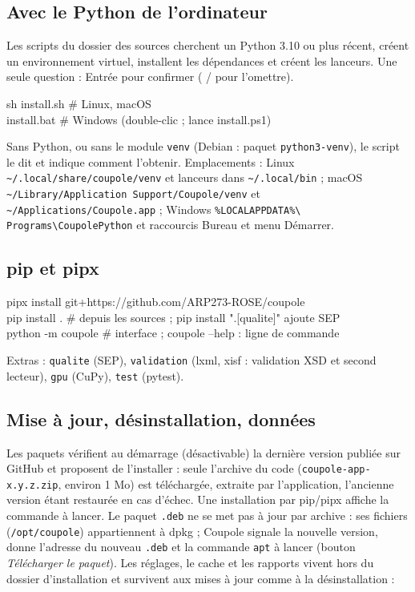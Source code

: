 \subsection{Avec le Python de l'ordinateur}
Les scripts du dossier des sources cherchent un Python 3.10 ou plus récent, créent un environnement virtuel,
installent les dépendances et créent les lanceurs. Une seule question : Entrée pour confirmer ( /
 pour l'omettre).
\begin{ccode}
sh install.sh                \# Linux, macOS\\
install.bat                  \# Windows (double-clic ; lance install.ps1)
\end{ccode}
Sans Python, ou sans le module \texttt{venv} (Debian : paquet \texttt{python3-venv}), le script le dit et indique
comment l'obtenir. Emplacements : Linux \texttt{\textasciitilde/.local/share/coupole/venv} et lanceurs dans
\texttt{\textasciitilde/.local/bin} ; macOS \texttt{\textasciitilde/Library/Application Support/Coupole/venv} et
\texttt{\textasciitilde/Applications/Coupole.app} ; Windows \texttt{\%LOCALAPPDATA\%\textbackslash
Programs\textbackslash CoupolePython} et raccourcis Bureau et menu Démarrer.

\subsection{pip et pipx}
\begin{ccode}
pipx install git+https://github.com/ARP273-ROSE/coupole\\
pip install .                 \# depuis les sources ; pip install ".[qualite]" ajoute SEP\\
python -m coupole             \# interface ; coupole --help : ligne de commande
\end{ccode}
Extras : \texttt{qualite} (SEP), \texttt{validation} (lxml, xisf : validation XSD et second lecteur),
\texttt{gpu} (CuPy), \texttt{test} (pytest).

\subsection{Mise à jour, désinstallation, données}\label{sec:donnees}
Les paquets vérifient au démarrage (désactivable) la dernière version publiée sur GitHub et proposent de
l'installer : seule l'archive du code (\texttt{coupole-app-x.y.z.zip}, environ 1 Mo) est téléchargée, extraite par
l'application, l'ancienne version étant restaurée en cas d'échec. Une installation par pip/pipx affiche la commande
à lancer. Le paquet \texttt{.deb} ne se met pas à jour par archive : ses fichiers (\texttt{/opt/coupole}) appartiennent à
dpkg ; Coupole signale la nouvelle version, donne l'adresse du nouveau \texttt{.deb} et la commande \texttt{apt} à
lancer (bouton \emph{Télécharger le paquet}). Les réglages, le cache et les rapports vivent hors du dossier
d'installation et survivent aux mises à jour comme à la désinstallation :

